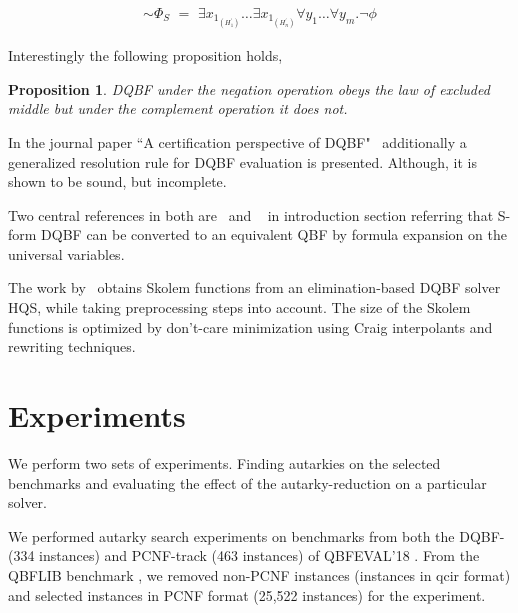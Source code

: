 \documentclass[runningheads]{llncs}
\newtheorem{prop}{Proposition}
\begin{document}
\begin{align}
\sim \Phi_{S} \,\, =   \,\, \exists x_{1_{(H^{\prime}_1)}}\dots \exists x_{1_{(H^{\prime}_n)}} \forall y_{1}\dots\forall y_{m} . \neg \phi \label{eq4}
\end{align}

Interestingly the following proposition holds,
\begin{prop}
	DQBF under the negation operation obeys the law of excluded middle but under the complement operation it does not.
\end{prop}

In the journal paper ``A certification perspective of DQBF"~\cite{balabanov2014henkin} additionally a generalized resolution rule for DQBF evaluation is presented. Although,  it is shown to be sound, but incomplete.

Two central references in both are~\cite{bubeck2006dependency} and ~\cite{bubeck2010model} in introduction section referring that S-form DQBF can be converted to an equivalent QBF by formula expansion on the universal variables.


The work by~\cite{wimmer2016skolem} obtains Skolem functions from an elimination-based DQBF solver HQS, while taking preprocessing steps into account.
%
The size of the Skolem functions is optimized by don’t-care minimization using Craig interpolants and rewriting techniques.


\section{Experiments}\label{sec:experiments}
We perform two sets of experiments. Finding autarkies on the selected benchmarks and evaluating the effect of the autarky-reduction on a particular solver.

We performed autarky search experiments on benchmarks from both the DQBF- (334 instances) and  PCNF-track (463 instances) of QBFEVAL'18 \cite{Qbfeval18}.
%
From the QBFLIB benchmark \cite{Qbflib}, we removed non-PCNF instances (instances in qcir format) and selected instances in PCNF format (25,522 instances) for the experiment.


\end{document}
